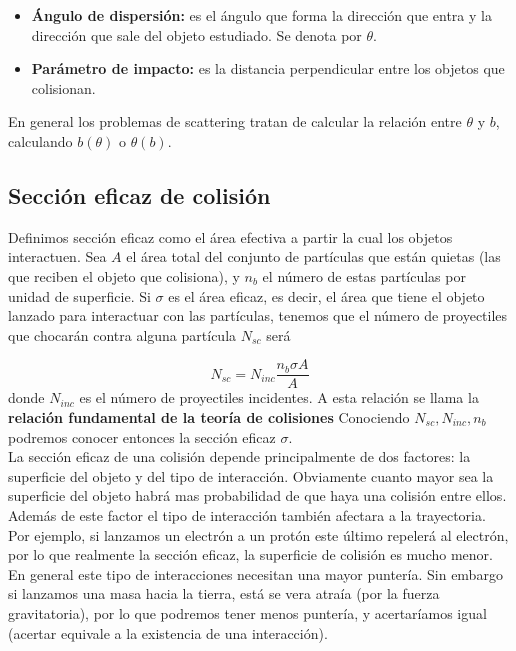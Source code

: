 \documentclass[12pt,a4paper]{book}
\begin{document}
\begin{itemize}
\item  \textbf{Ángulo de dispersión:} es el ángulo que forma la dirección que entra y la dirección que sale del objeto estudiado. Se denota por $\theta$.
\item \textbf{Parámetro de impacto:} es la distancia perpendicular entre los objetos que colisionan.
\end{itemize}

En general los problemas de scattering tratan de calcular la relación entre $\theta$ y $b$, calculando $b(\theta)$ o $\theta(b)$. 

\subsection{Sección eficaz de colisión}

Definimos sección eficaz como el área efectiva a partir la cual los objetos interactuen.
Sea $A$ el área total del conjunto de partículas que están quietas (las que reciben el objeto que colisiona), y $n_b$ el número de estas partículas por unidad de superficie. Si $\sigma$ es el área eficaz, es decir, el área que tiene el objeto lanzado para interactuar con las partículas, tenemos que el número de proyectiles que chocarán contra alguna partícula $N_{sc}$ será

\begin{equation}
N_{sc} = N_{inc} \dfrac{n_b \sigma A}{A}
\end{equation}
donde $N_{inc}$ es el número de proyectiles incidentes. A esta relación se llama la \textbf{relación fundamental de la teoría de colisiones}  Conociendo $N_{sc}, N_{inc}, n_b$ podremos conocer entonces la sección eficaz $\sigma$. \\

La sección eficaz de una colisión depende principalmente de dos factores: la superficie del objeto y del tipo de interacción. Obviamente cuanto mayor sea la superficie del objeto habrá mas probabilidad de que haya una colisión entre ellos. Además de este factor el tipo de interacción también afectara a la trayectoria. Por ejemplo, si lanzamos un electrón a un protón este último repelerá al electrón, por lo que realmente la sección eficaz, la superficie de colisión es mucho menor. En general este tipo de interacciones necesitan una mayor puntería. Sin embargo si lanzamos una masa hacia la tierra, está se vera atraía (por la fuerza gravitatoria), por lo que podremos tener menos puntería, y acertaríamos igual (acertar equivale a la existencia de una interacción).\\
 
\end{document}
